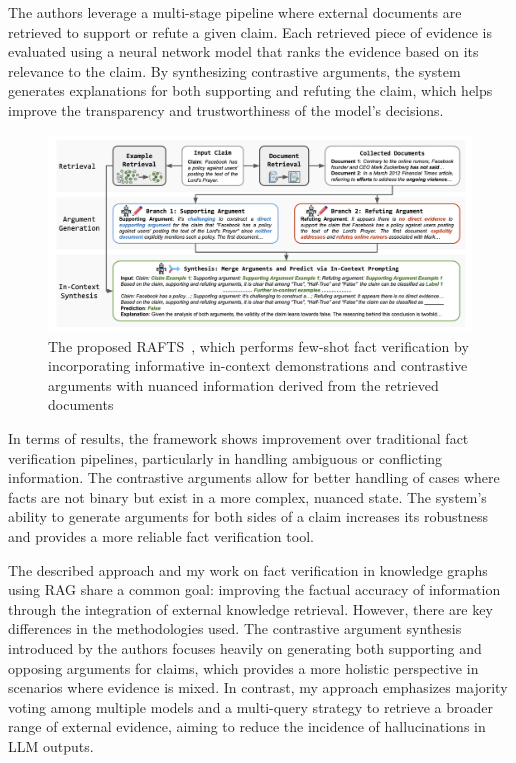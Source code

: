 The authors leverage a multi-stage pipeline where external documents are retrieved to support or refute a given claim.
Each retrieved piece of evidence is evaluated using a neural network model that ranks the evidence based on its relevance to the claim.
By synthesizing contrastive arguments, the system generates explanations for both supporting and refuting the claim, which helps improve the transparency and trustworthiness of the model's decisions.

\begin{figure}[ht!]
    \centering
    \begin{minipage}[b]{\textwidth}
        \centering
        \includegraphics[width=\textwidth]{res/rel-rafts}
        \caption{The proposed RAFTS~\cite{yue2024retrievalaugmentedfactverification}, which performs few-shot fact verification by incorporating informative in-context demonstrations and contrastive arguments with nuanced information derived from the retrieved documents}
        \label{fig:rel-rafts}
    \end{minipage}
\end{figure}

In terms of results, the framework shows improvement over traditional fact verification pipelines, particularly in handling ambiguous or conflicting information.
The contrastive arguments allow for better handling of cases where facts are not binary but exist in a more complex, nuanced state.
The system's ability to generate arguments for both sides of a claim increases its robustness and provides a more reliable fact verification tool.

The described approach and my work on fact verification in knowledge graphs using RAG share a common goal: improving the factual accuracy of information through the integration of external knowledge retrieval.
However, there are key differences in the methodologies used.
The contrastive argument synthesis introduced by the authors focuses heavily on generating both supporting and opposing arguments for claims, which provides a more holistic perspective in scenarios where evidence is mixed.
In contrast, my approach emphasizes majority voting among multiple models and a multi-query strategy to retrieve a broader range of external evidence, aiming to reduce the incidence of hallucinations in LLM outputs.

